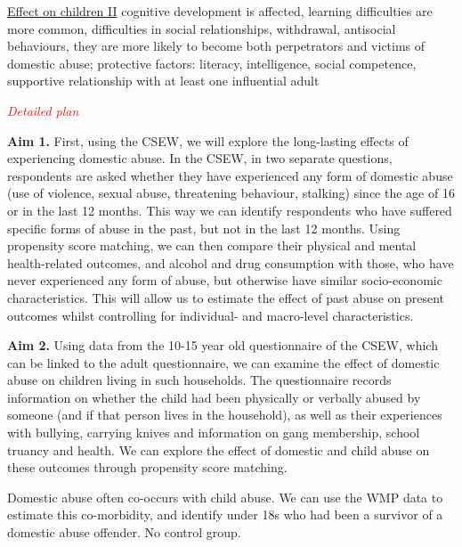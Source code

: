 \documentclass[11pt, a4paper]{article}
\begin{document}
\href{https://www.psychologytoday.com/gb/blog/progress-notes/201902/alarming-effects-childrens-exposure-domestic-violence}{Effect on children II} cognitive development is affected, learning difficulties are more common, difficulties in social relationships, withdrawal, antisocial behaviours, they are more likely to become both perpetrators and victims of domestic abuse; protective factors: literacy, intelligence, social competence, supportive relationship with at least one influential adult 


\textcolor{red}{\textit{Detailed plan}}

\textbf{Aim 1.} First, using the CSEW, we will explore the long-lasting effects of experiencing domestic abuse. In the CSEW, in two separate questions, respondents are asked whether they have experienced any form of domestic abuse (use of violence, sexual abuse, threatening behaviour, stalking) since the age of 16 or in the last 12 months. This way we can identify respondents who have suffered specific forms of abuse in the past, but not in the last 12 months. Using propensity score matching, we can then compare their physical and mental health-related outcomes, and alcohol and drug consumption with those, who have never experienced any form of abuse, but otherwise have similar socio-economic characteristics. This will allow us to estimate the effect of past abuse on present outcomes whilst controlling for individual- and macro-level characteristics.  

\textbf{Aim 2.} Using data from the 10-15 year old questionnaire of the CSEW, which can be linked to the adult questionnaire, we can examine the effect of domestic abuse on children living in such households. The questionnaire records information on whether the child had been physically or verbally abused by someone (and if that person lives in the household), as well as their experiences with bullying, carrying knives and information on gang membership, school truancy and health. We can explore the effect of domestic and child abuse on these outcomes through propensity score matching.

Domestic abuse often co-occurs with child abuse. We can use the WMP data to estimate this co-morbidity, and identify under 18s who had been a survivor of a domestic abuse offender. No control group. 



\end{document}

